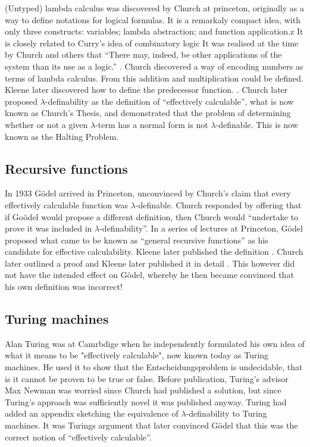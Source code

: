 (Untyped) lambda calculus was discovered by Church at princeton, originally as a way to define notations for logical formulas. It is a remarkaly compact idea, with only three constructs: variables; lambda abstraction; and function application.z It is closely related to Curry's idea of combinatory logic \cite{curry1930a, curry1930b} It was realised at the time by Church and others that ``There may, indeed, be other applications of the system than its use as a logic.'' \cite{church1932, church1933}. Church discovered a way of encoding numbers as terms of lambda calculus. From this addition and multiplication could be defined. Kleene later discovered how to define the predecessor function. \cite{kleene1935a, kleene1935b}. Church later proposed $\lambda$-definability as the definition of ``effectively calculable'', what is now known as Church's Thesis, and demonstrated that the problem of determining whether or not a given $\lambda$-term  has a normal form is not $\lambda$-definable. This is now known as the Halting Problem. 

\subsection{Recursive functions}

In 1933 G\"odel arrived in Princeton, unconvinced by Church's claim that every effectively calculable function was $\lambda$-definable. Church responded by offering that if Go\"odel would propose a different definition, then Church would ``undertake to prove it was included in $\lambda$-definability''. In a series of lectures at Princeton, G\"odel proposed what came to be known as ``general recursive functions'' as his candidate for effective calculability. Kleene later published the definition \cite{kleene1936}. Church later outlined a proof \cite{church1936} and Kleene later published it in detail \cite{kleene1936b}. This however did not have the intended effect on G\"odel, whereby he then became convinced that his own definition was incorrect!

\subsection{Turing machines}

Alan Turing was at Camrbdige when he independently formulated his own idea of what it means to be "effectively calculable", now known today as Turing machines. He used it to show that the Entscheidungsproblem is undecidable, that is it cannot be proven to be true or false. Before publication, Turing's advisor Max Newman was worried since Church had published a solution, but since Turing's approach was sufficiently novel it was published anyway. Turing had added an appendix sketching the equivalence of $\lambda$-definability to Turing machines. It was Turings argument that later convinced G\"odel that this was the correct notion of ``effectively calculable''.

